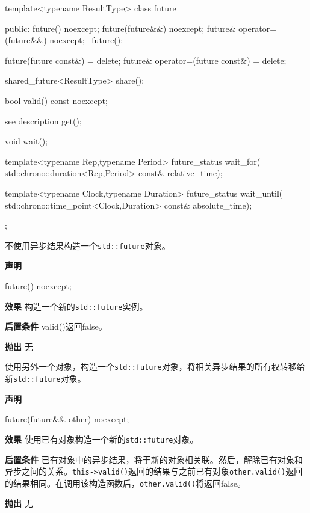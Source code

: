 \begin{cpp}
template<typename ResultType>
class future
{
public:
  future() noexcept;
  future(future&&) noexcept;
  future& operator=(future&&) noexcept;
  ~future();

  future(future const&) = delete;
  future& operator=(future const&) = delete;

  shared_future<ResultType> share();

  bool valid() const noexcept;

  see description get();

  void wait();

  template<typename Rep,typename Period>
  future_status wait_for(
      std::chrono::duration<Rep,Period> const& relative_time);

  template<typename Clock,typename Duration>
  future_status wait_until(
      std::chrono::time_point<Clock,Duration> const& absolute_time);
};
\end{cpp}


不使用异步结果构造一个\texttt{std::future}对象。

\textbf{声明}

\begin{cpp}
future() noexcept;
\end{cpp}

\textbf{效果}
构造一个新的\texttt{std::future}实例。

\textbf{后置条件}
valid()返回false。

\textbf{抛出}
无


使用另外一个对象，构造一个\texttt{std::future}对象，将相关异步结果的所有权转移给新\texttt{std::future}对象。

\textbf{声明}

\begin{cpp}
future(future&& other) noexcept;
\end{cpp}

\textbf{效果}
使用已有对象构造一个新的\texttt{std::future}对象。

\textbf{后置条件}
已有对象中的异步结果，将于新的对象相关联。然后，解除已有对象和异步之间的关系。\texttt{this->valid()}返回的结果与之前已有对象\texttt{other.valid()}返回的结果相同。在调用该构造函数后，\texttt{other.valid()}将返回false。

\textbf{抛出}
无


